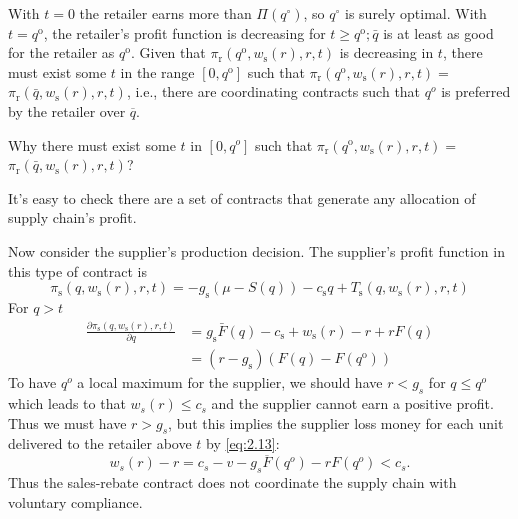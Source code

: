 With $t=0$ the retailer earns more than $\Pi\left(q^{\circ}\right)$, so $q^{\circ}$ is surely optimal. With $t=q^{\mathrm{o}}$, the retailer's profit function is decreasing for $t \geq q^{\mathrm{o}} ; \bar{q}$ is at least as good for the retailer as $q^{\mathrm{o}}$. Given that $\pi_{\mathrm{r}}\left(q^{\mathrm{o}}, w_{\mathrm{s}}(r), r, t\right)$ is decreasing in $t$, there must exist some $t$ in the range $\left[0, q^{\mathrm{o}}\right]$ such that $\pi_{\mathrm{r}}\left(q^{\mathrm{o}}, w_{\mathrm{s}}(r), r, t\right)=$ $\pi_{\mathrm{r}}\left(\bar{q}, w_{\mathrm{s}}(r), r, t\right)$, i.e., there are coordinating contracts such that $q^o$ is preferred by the retailer over $\overline{q}$.
\begin{note}
    Why there must exist some $t$ in $[0,q^o]$ such that $\pi_{\mathrm{r}}\left(q^{\mathrm{o}}, w_{\mathrm{s}}(r), r, t\right)=$ $\pi_{\mathrm{r}}\left(\bar{q}, w_{\mathrm{s}}(r), r, t\right)$?
\end{note}
\begin{note}
    It's easy to check there are a set of contracts that generate any allocation of supply chain's profit.
\end{note}
Now consider the supplier's production decision. The supplier's profit function in this type of contract is 
$$
\pi_{\mathrm{s}}\left(q, w_{\mathrm{s}}(r), r, t\right)=-g_{\mathrm{s}}(\mu-S(q))-c_{\mathrm{s}} q+T_{\mathrm{s}}\left(q, w_{\mathrm{s}}(r), r, t\right)
$$
For $q>t$
$$
\begin{aligned}
\frac{\partial \pi_{\mathrm{s}}\left(q, w_{\mathrm{s}}(r), r, t\right)}{\partial q} &=g_{\mathrm{s}} \bar{F}(q)-c_{\mathrm{s}}+w_{\mathrm{s}}(r)-r+r F(q) \\
&=\left(r-g_{\mathrm{s}}\right)\left(F(q)-F\left(q^{\mathrm{o}}\right)\right)
\end{aligned}
$$
To have $q^o$ a local maximum for the supplier, we should have $r<g_s$ for $q\leq q^o$ which leads to that $w_s(r)\leq c_s$ and the supplier cannot earn a positive profit. Thus we must have $r>g_s$, but this implies the supplier loss money for each unit delivered to the retailer above $t$ by \autoref{eq:2.13}:
\begin{equation*}
    w_s(r)-r=c_s-v-g_s\overline{F}(q^o)-rF(q^o)<c_s.
\end{equation*}
Thus the sales-rebate contract does not coordinate the supply chain with voluntary compliance.

